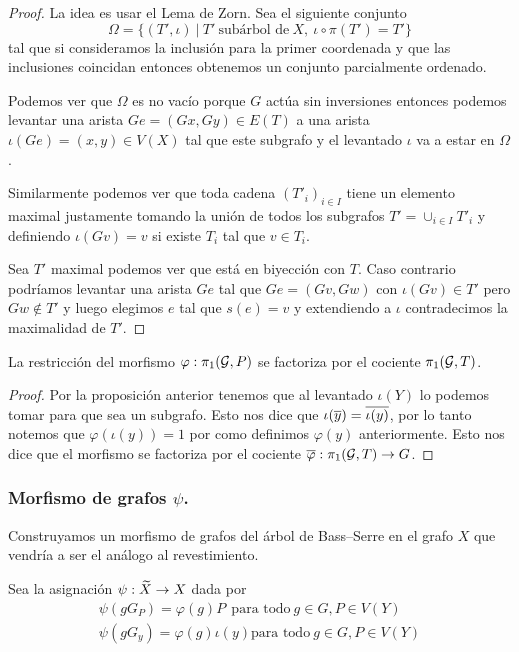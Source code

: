 \documentclass[tesis.tex]{subfiles}
\begin{document}
\begin{proof}
	La idea es usar el Lema de Zorn.
	Sea el siguiente conjunto
	\[
		\Omega = \{ (T', \iota)	  \ | \   T' \ \text{subárbol de} \ X, \ \iota \circ \pi(T') = T' \}
	\]
	tal que si consideramos la inclusión para la primer coordenada y que las inclusiones coincidan entonces obtenemos un conjunto parcialmente ordenado.
	
	Podemos ver que $\Omega$ es no vacío porque $G$ actúa sin inversiones entonces podemos levantar una arista $Ge = (Gx,Gy) \in E(T)$ a una arista $\iota (Ge) = (x,y) \in V(X)$ tal que este subgrafo y el levantado $\iota$ va a estar en $\Omega$.
	
	Similarmente podemos ver que toda cadena $(T'_i)_{i \in I}$ tiene un elemento maximal justamente tomando la unión de todos los subgrafos $T' = \cup_{i \in I} T'_{i}$ y definiendo $\iota(Gv) = v$ si existe $T_{i}$ tal que $v \in T_{i}$.
	
	Sea $T'$ maximal podemos ver que está en biyección con $T$.
	Caso contrario podríamos levantar una arista $Ge$ tal que $Ge=(Gv,Gw)$ con $\iota(Gv) \in T'$ pero $Gw \notin T'$ y luego elegimos $e$ tal que $s(e) = v$ y extendiendo a $\iota$ contradecimos la maximalidad de $T'$.	
	
\end{proof}

\begin{coro}
	La restricción del morfismo $\varphi: \pi_1({\cal G}, P)$ se factoriza por el cociente $\pi_1({\cal G}, T)$.
\end{coro}
\begin{proof}
	Por la proposición anterior tenemos que al levantado $\iota(Y)$ lo podemos tomar para que sea un subgrafo.
	Esto nos dice que $\iota(\overline y) = \overline {\iota (y)}$, por lo tanto notemos que $\varphi(\iota(y)) = 1$ por como definimos $\varphi(y)$ anteriormente.
	Esto nos dice que el morfismo se factoriza por el cociente $\overline \varphi:\pi_1({\cal G}, T) \to G$.
\end{proof}

\subsubsection{Morfismo de grafos $\psi$.}

Construyamos un morfismo de grafos del árbol de Bass--Serre en el grafo $X$ que vendría a ser el análogo al revestimiento.

Sea la asignación $\psi: \widetilde X \to X$ dada por 
\begin{align*}
	\psi(g G_P ) = \varphi(g) P \ \ \text{para todo} \ g \in G, P \in V(Y) \\
	\psi(g G_y ) = \varphi(g) \iota(y) \text{para todo} \ g \in G, P \in V(Y)
\end{align*}
\end{document}
